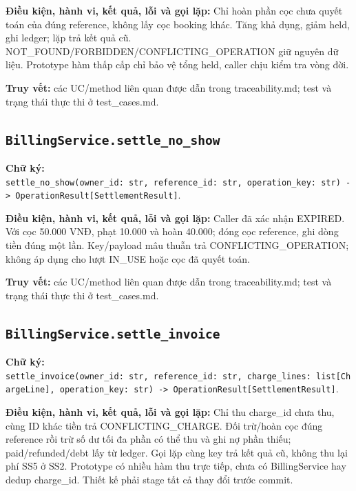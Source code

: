 \documentclass[11pt,a4paper]{article}
\begin{document}
\textbf{Điều kiện, hành vi, kết quả, lỗi và gọi lặp:} Chỉ hoàn phần cọc
chưa quyết toán của đúng reference, không lấy cọc booking khác. Tăng khả
dụng, giảm held, ghi ledger; lặp trả kết quả cũ.
NOT\_FOUND/FORBIDDEN/CONFLICTING\_OPERATION giữ nguyên dữ liệu.
Prototype hàm thấp cấp chỉ bảo vệ tổng held, caller chịu kiểm tra vòng
đời.

\textbf{Truy vết:} các UC/method liên quan được dẫn trong
traceability.md; test và trạng thái thực thi ở test\_cases.md.

\hypertarget{billingservice.settle_no_show}{%
\subsection{\texorpdfstring{\texttt{BillingService.settle\_no\_show}}{BillingService.settle\_no\_show}}\label{billingservice.settle_no_show}}

\textbf{Chữ ký:}
\texttt{settle\_no\_show(owner\_id:\ str,\ reference\_id:\ str,\ operation\_key:\ str)\ -\textgreater{}\ OperationResult{[}SettlementResult{]}}.

\textbf{Điều kiện, hành vi, kết quả, lỗi và gọi lặp:} Caller đã xác nhận
EXPIRED. Với cọc 50.000 VNĐ, phạt 10.000 và hoàn 40.000; đóng cọc
reference, ghi dòng tiền đúng một lần. Key/payload mâu thuẫn trả
CONFLICTING\_OPERATION; không áp dụng cho lượt IN\_USE hoặc cọc đã quyết
toán.

\textbf{Truy vết:} các UC/method liên quan được dẫn trong
traceability.md; test và trạng thái thực thi ở test\_cases.md.

\hypertarget{billingservice.settle_invoice}{%
\subsection{\texorpdfstring{\texttt{BillingService.settle\_invoice}}{BillingService.settle\_invoice}}\label{billingservice.settle_invoice}}

\textbf{Chữ ký:}
\texttt{settle\_invoice(owner\_id:\ str,\ reference\_id:\ str,\ charge\_lines:\ list{[}ChargeLine{]},\ operation\_key:\ str)\ -\textgreater{}\ OperationResult{[}SettlementResult{]}}.

\textbf{Điều kiện, hành vi, kết quả, lỗi và gọi lặp:} Chỉ thu charge\_id
chưa thu, cùng ID khác tiền trả CONFLICTING\_CHARGE. Đối trừ/hoàn cọc
đúng reference rồi trừ số dư tối đa phần có thể thu và ghi nợ phần
thiếu; paid/refunded/debt lấy từ ledger. Gọi lặp cùng key trả kết quả
cũ, không thu lại phí SS5 ở SS2. Prototype có nhiều hàm thu trực tiếp,
chưa có BillingService hay dedup charge\_id. Thiết kế phải stage tất cả
thay đổi trước commit.
\end{document}
